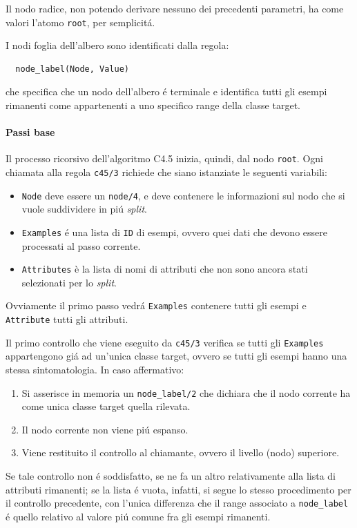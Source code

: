 \documentclass[preprint]{acm_proc_article-sp}
\begin{document}
Il nodo radice, non potendo derivare nessuno dei precedenti parametri, ha come valori l'atomo \verb|root|, per semplicit\'a.

I nodi foglia dell'albero sono identificati dalla regola:
\begin{verbatim}
  node_label(Node, Value)
\end{verbatim}
che specifica che un nodo dell'albero \'e terminale e identifica tutti gli esempi rimanenti come appartenenti a uno specifico range della classe target.

\paragraph{Passi base}
\label{prolog-impl-passi-base}
Il processo ricorsivo dell'algoritmo C4.5 inizia, quindi, dal nodo \verb|root|. Ogni chiamata alla regola \verb|c45/3| richiede che siano istanziate le seguenti variabili:
\begin{itemize}
\item \verb|Node| deve essere un \verb|node/4|, e deve contenere le informazioni sul nodo che si vuole suddividere in pi\'u \textit{split}.
\item \verb|Examples| \'e una lista di \verb|ID| di esempi, ovvero quei dati che devono essere processati al passo corrente.
\item \verb|Attributes| è la lista di nomi di attributi che non sono ancora stati selezionati per lo \textit{split}.
\end{itemize}

Ovviamente il primo passo vedr\'a \verb|Examples| contenere tutti gli esempi e \verb|Attribute| tutti gli attributi.

Il primo controllo che viene eseguito da \verb|c45/3| verifica se tutti gli \verb|Examples| appartengono gi\'a ad un'unica classe target, ovvero se tutti gli esempi hanno una stessa sintomatologia. In caso affermativo:
\begin{enumerate}
\item Si asserisce in memoria un \verb|node_label/2| che dichiara che il nodo corrente ha come unica classe target quella rilevata.
\item Il nodo corrente non viene pi\'u espanso.
\item Viene restituito il controllo al chiamante, ovvero il livello (nodo) superiore.
\end{enumerate}

Se tale controllo non \'e soddisfatto, se ne fa un altro relativamente alla lista di attributi rimanenti; se la lista \'e vuota, infatti, si segue lo stesso procedimento per il controllo precedente, con l'unica differenza che il range associato a \verb|node_label| \'e quello relativo al valore pi\'u comune fra gli esempi rimanenti.
\end{document}
